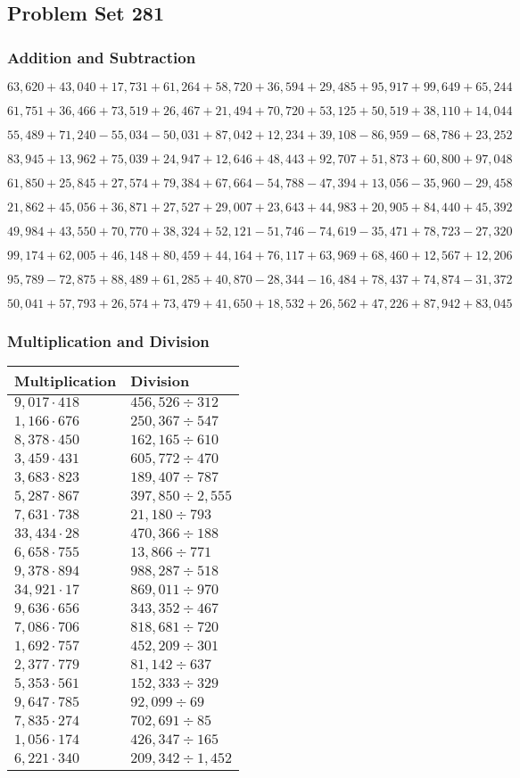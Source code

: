 \hypertarget{problem-set-281}{%
\subsection{Problem Set 281}\label{problem-set-281}}

\hypertarget{addition-and-subtraction}{%
\subsubsection{Addition and
Subtraction}\label{addition-and-subtraction}}

\(63,620+43,040+17,731+61,264+58,720+36,594+29,485+95,917+99,649+65,244\)

\(61,751+36,466+73,519+26,467+21,494+70,720+53,125+50,519+38,110+14,044\)

\(55,489+71,240-55,034-50,031+87,042+12,234+39,108-86,959-68,786+23,252\)

\(83,945+13,962+75,039+24,947+12,646+48,443+92,707+51,873+60,800+97,048\)

\(61,850+25,845+27,574+79,384+67,664-54,788-47,394+13,056-35,960-29,458\)

\(21,862+45,056+36,871+27,527+29,007+23,643+44,983+20,905+84,440+45,392\)

\(49,984+43,550+70,770+38,324+52,121-51,746-74,619-35,471+78,723-27,320\)

\(99,174+62,005+46,148+80,459+44,164+76,117+63,969+68,460+12,567+12,206\)

\(95,789-72,875+88,489+61,285+40,870-28,344-16,484+78,437+74,874-31,372\)

\(50,041+57,793+26,574+73,479+41,650+18,532+26,562+47,226+87,942+83,045\)

\hypertarget{multiplication-and-division}{%
\subsubsection{Multiplication and
Division}\label{multiplication-and-division}}

\begin{longtable}[]{@{}ll@{}}
\toprule
Multiplication & Division\tabularnewline
\midrule
\endhead
\(9,017\cdot418\) & \(456,526 ÷312\)\tabularnewline
\(1,166\cdot676\) & \(250,367÷547\)\tabularnewline
\(8,378\cdot450\) & \(162,165÷610\)\tabularnewline
\(3,459\cdot431\) & \(605,772÷470\)\tabularnewline
\(3,683\cdot823\) & \(189,407÷787\)\tabularnewline
\(5,287\cdot867\) & \(397,850÷2,555\)\tabularnewline
\(7,631\cdot738\) & \(21,180÷793\)\tabularnewline
\(33,434\cdot28\) & \(470,366÷188\)\tabularnewline
\(6,658\cdot755\) & \(13,866÷771\)\tabularnewline
\(9,378\cdot894\) & \(988,287÷518\)\tabularnewline
\(34,921\cdot17\) & \(869,011÷970\)\tabularnewline
\(9,636\cdot656\) & \(343,352÷467\)\tabularnewline
\(7,086\cdot706\) & \(818,681÷720\)\tabularnewline
\(1,692\cdot757\) & \(452,209÷301\)\tabularnewline
\(2,377\cdot779\) & \(81,142÷637\)\tabularnewline
\(5,353\cdot561\) & \(152,333÷329\)\tabularnewline
\(9,647\cdot785\) & \(92,099÷69\)\tabularnewline
\(7,835\cdot274\) & \(702,691÷85\)\tabularnewline
\(1,056\cdot174\) & \(426,347÷165\)\tabularnewline
\(6,221\cdot340\) & \(209,342÷1,452\)\tabularnewline
\bottomrule
\end{longtable}
